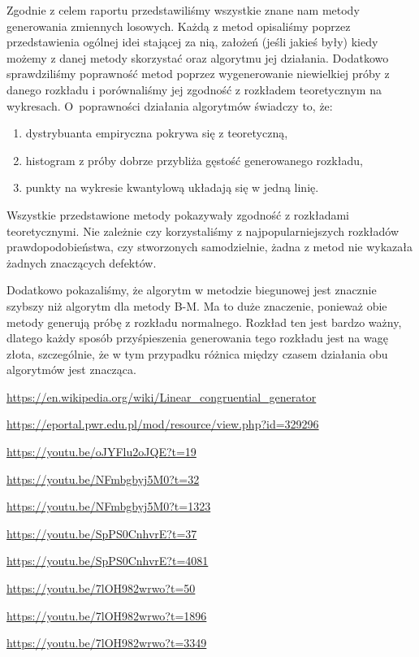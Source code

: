 \documentclass[12pt]{mwrep}
\begin{document}
	\noindent Zgodnie z celem raportu przedstawiliśmy wszystkie znane nam metody generowania zmiennych losowych. Każdą z metod opisaliśmy poprzez przedstawienia ogólnej idei stającej za nią, założeń (jeśli jakieś były) kiedy możemy z danej metody skorzystać oraz algorytmu jej działania. Dodatkowo sprawdziliśmy poprawność metod poprzez wygenerowanie niewielkiej próby z danego rozkładu i porównaliśmy jej zgodność z rozkładem teoretycznym na wykresach.
	O~poprawności działania algorytmów świadczy to, że:
	\begin{enumerate}[leftmargin=10mm]
		\item dystrybuanta empiryczna pokrywa się z teoretyczną,
		\item histogram z próby dobrze przybliża gęstość generowanego rozkładu,
		\item punkty na wykresie kwantylową układają się w jedną linię.
	\end{enumerate}
	Wszystkie przedstawione metody pokazywały zgodność z rozkładami teoretycznymi. Nie zależnie czy korzystaliśmy z najpopularniejszych rozkładów prawdopodobieństwa, czy stworzonych samodzielnie, żadna z metod nie wykazała żadnych znaczących defektów.
	
	
	
	
	
	\noindent Dodatkowo pokazaliśmy, że algorytm w metodzie biegunowej jest znacznie szybszy niż algorytm dla metody B-M. Ma to duże znaczenie, ponieważ obie metody generują próbę z rozkładu normalnego. Rozkład ten jest bardzo ważny, dlatego każdy sposób przyśpieszenia generowania tego rozkładu jest na wagę złota, szczególnie, że w tym przypadku różnica między czasem działania obu algorytmów jest znacząca.

		
	
	
	\begin{thebibliography}{1}
		\url{https://en.wikipedia.org/wiki/Linear_congruential_generator}
		
		\url{https://eportal.pwr.edu.pl/mod/resource/view.php?id=329296}
		
		\url{https://youtu.be/oJYFlu2oJQE?t=19}
		
		\url{https://youtu.be/NFmbgbyj5M0?t=32}
		
		\url{https://youtu.be/NFmbgbyj5M0?t=1323}
		
		\url{https://youtu.be/SpPS0CnhvrE?t=37}
		
		\url{https://youtu.be/SpPS0CnhvrE?t=4081}
		
		\url{https://youtu.be/7lOH982wrwo?t=50}
		
		\url{https://youtu.be/7lOH982wrwo?t=1896}
		
		\url{https://youtu.be/7lOH982wrwo?t=3349}

	\end{thebibliography}
	
\end{document}

